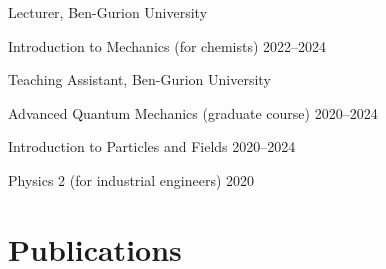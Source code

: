 \documentclass[letterpaper,12pt]{article}
\renewenvironment{itemize}{
  \begin{list}{}{
    \setlength{\leftmargin}{1.5em}
  }
}{
  \end{list}
}
\begin{document}
\begin{itemize}
	\item Lecturer, Ben-Gurion University
	\item \hspace{10mm} Introduction to Mechanics (for chemists) \hfill 2022--2024
	\item Teaching Assistant, Ben-Gurion University
	\item \hspace{10mm} Advanced Quantum Mechanics (graduate course) \hfill 2020--2024
	\item \hspace{10mm} Introduction to Particles and Fields \hfill 2020--2024
	\item \hspace{10mm} Physics 2 (for industrial engineers) \hfill 2020
\end{itemize}

\vspace{-5mm}
\section*{Publications}
\end{document}
